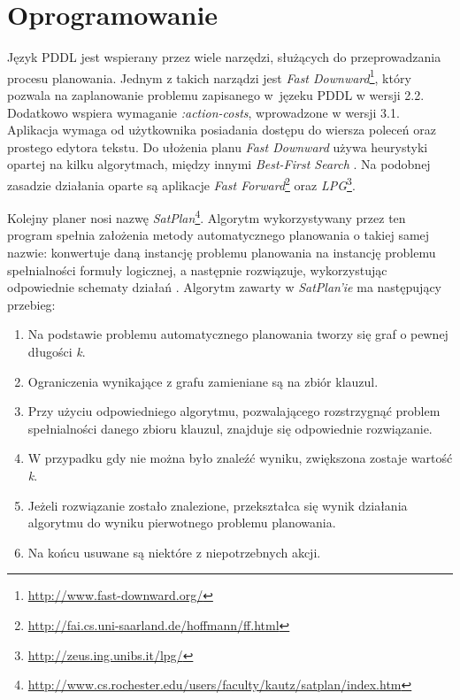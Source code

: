\section{Oprogramowanie}
\label{sec:oprogramowanie}
Język PDDL jest wspierany przez wiele narzędzi, służących do przeprowadzania procesu planowania. Jednym z takich narządzi jest \textit{Fast Downward}\footnote{\url{http://www.fast-downward.org/}}, który pozwala na zaplanowanie problemu zapisanego w~jęzeku PDDL w wersji 2.2. Dodatkowo wspiera wymaganie \textit{:action-costs}, wprowadzone w wersji 3.1. Aplikacja wymaga od użytkownika posiadania dostępu do wiersza poleceń oraz prostego edytora tekstu. Do ułożenia planu \textit{Fast Downward} używa heurystyki opartej na kilku algorytmach, między innymi \textit{Best-First Search} \cite{fdalgorytm}. Na podobnej zasadzie działania oparte są aplikacje \textit{Fast Forward}\footnote{\url{http://fai.cs.uni-saarland.de/hoffmann/ff.html}} oraz \textit{LPG}\footnote{\url{http://zeus.ing.unibs.it/lpg/}}.

Kolejny planer nosi nazwę \textit{SatPlan}\footnote{\url{http://www.cs.rochester.edu/users/faculty/kautz/satplan/index.htm}}. Algorytm wykorzystywany przez ten program spełnia założenia metody automatycznego planowania o takiej samej nazwie: konwertuje daną instancję problemu planowania na instancję problemu spełnialności formuły logicznej, a następnie rozwiązuje, wykorzystując odpowiednie schematy działań \cite{satplan}. Algorytm zawarty w \textit{SatPlan'ie} ma następujący przebieg: 

  \begin{enumerate}
\item Na podstawie problemu automatycznego planowania tworzy się graf o pewnej długości \textit{k}.
\item Ograniczenia wynikające z grafu zamieniane są na zbiór klauzul.
\item Przy użyciu odpowiedniego algorytmu, pozwalającego rozstrzygnąć problem spełnialności danego zbioru klauzul, znajduje się odpowiednie rozwiązanie.
\item W przypadku gdy nie można było znaleźć wyniku, zwiększona zostaje wartość \textit{k}.
\item Jeżeli rozwiązanie zostało znalezione, przekształca się wynik działania algorytmu do wyniku pierwotnego problemu planowania.
\item Na końcu usuwane są niektóre z niepotrzebnych akcji.
\end{enumerate}


